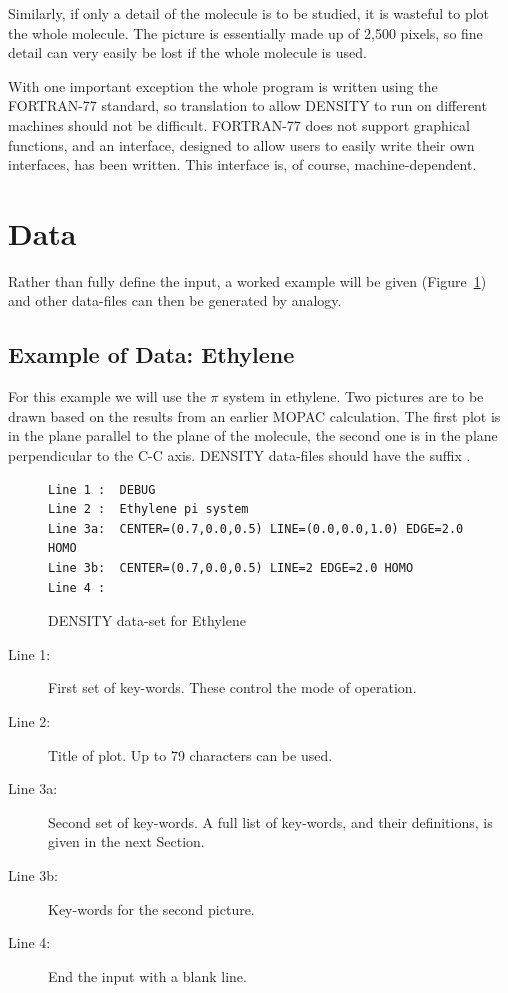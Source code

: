 Similarly, if only a detail of the molecule is to be studied, it is wasteful to
plot the whole molecule. The picture is essentially made up of 2,500 pixels, so
fine detail can very easily be lost if the whole molecule is used.

With one important exception the whole program is written using the FORTRAN-77
standard, so translation to allow DENSITY to run on different machines should
not be difficult. FORTRAN-77 does not support graphical functions, and an
interface, designed to allow users to easily write their own interfaces, has
been written.  This interface is, of course, machine-dependent.

\section{Data}
Rather than fully define the input, a worked example will be given
(Figure~\ref{d_c2h4}) and other data-files can then be generated by analogy.

\subsection{Example of Data: Ethylene}
For this example we will use the $\pi$ system in ethylene. Two pictures are to
be drawn based on the results from an earlier MOPAC calculation.  The first
plot is in the plane parallel  to the plane of the molecule, the second one is
in the plane perpendicular to the C-C axis.  DENSITY data-files should have the
suffix .
\begin{figure}
\begin{makeimage}
\end{makeimage}
\begin{verbatim}
Line 1 :  DEBUG
Line 2 :  Ethylene pi system
Line 3a:  CENTER=(0.7,0.0,0.5) LINE=(0.0,0.0,1.0) EDGE=2.0 HOMO
Line 3b:  CENTER=(0.7,0.0,0.5) LINE=2 EDGE=2.0 HOMO
Line 4 :
\end{verbatim}
\caption{\label{d_c2h4} DENSITY data-set for Ethylene}
\end{figure}

\begin{description}
\item[Line 1:] First set of key-words.  These  control the mode of operation.
\item[Line 2:] Title of plot. Up to 79 characters can be used.
\item[Line 3a:] Second set of key-words. A full list of key-words, and
their definitions, is given in the next Section.
\item[Line 3b:] Key-words for the second picture.
\item[Line 4:] End the input with a blank line.
\end{description}

